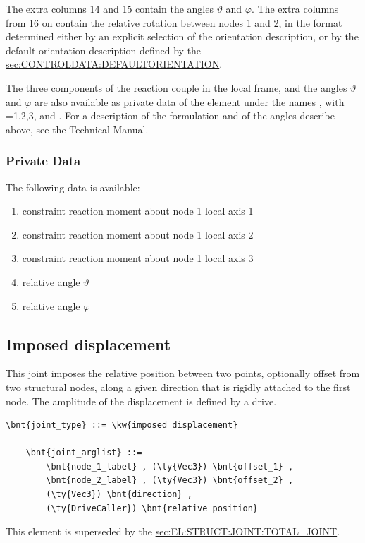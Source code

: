 The extra columns 14 and 15 contain the angles $\vartheta$ and $\varphi$.
The extra columns from 16 on contain the relative rotation
between nodes 1 and 2, in the format determined either by an explicit
selection of the orientation description, or by the default
orientation description defined by the 
\hyperref{\kw{default orientation} keyword}{\kw{default orientation} keyword (see Section~}{)}{sec:CONTROLDATA:DEFAULTORIENTATION}.

The three components of the reaction couple in the local frame, 
and the angles $\vartheta$ and $\varphi$ are also available
as private data of the element under the names ,
with =1,2,3,  and .
For a description of the formulation and of the angles describe above,
see the Technical Manual.

\subsubsection{Private Data}
The following data is available:
\begin{enumerate}
\item {} constraint reaction moment about node 1 local axis 1
\item {} constraint reaction moment about node 1 local axis 2
\item {} constraint reaction moment about node 1 local axis 3
\item {} relative angle $\vartheta$
\item {} relative angle $\varphi$
\end{enumerate}



\subsection{Imposed displacement}
\label{sec:EL:JOINT:IMPOSEDDISPLACEMENT}
This joint imposes the relative position between two points,
optionally offset from two structural nodes,
along a given direction that is rigidly attached to the first node.
The amplitude of the displacement is defined by a drive.
\begin{Verbatim}[commandchars=\\\{\}]
    \bnt{joint_type} ::= \kw{imposed displacement}

    \bnt{joint_arglist} ::= 
        \bnt{node_1_label} , (\ty{Vec3}) \bnt{offset_1} ,
        \bnt{node_2_label} , (\ty{Vec3}) \bnt{offset_2} ,
        (\ty{Vec3}) \bnt{direction} ,
        (\ty{DriveCaller}) \bnt{relative_position}
\end{Verbatim}
This element is superseded by the
\hyperref{\kw{total joint}}{\kw{total joint}, see Section~}{}{sec:EL:STRUCT:JOINT:TOTAL_JOINT}.


